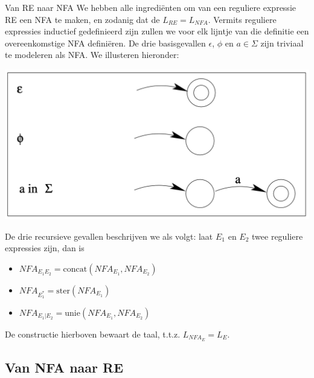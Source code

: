 \begin{theo}{Van RE naar NFA}
    We hebben alle ingrediënten om van een reguliere expressie RE een NFA te maken, en zodanig dat de $L_{RE} = L_{NFA}$.
    Vermits reguliere expressies inductief gedefinieerd zijn zullen we voor elk lijntje van die definitie een overeenkomstige NFA definiëren.
    De drie basisgevallen $\epsilon$, $\phi$ en $a \in \Sigma$ zijn triviaal te modeleren als NFA.
    We illusteren hieronder:
    \begin{center}
        \includegraphics[scale = 0.275]{Images/NFABasisGevallen.png}
    \end{center}
    De drie recursieve gevallen beschrijven we als volgt: laat $E_{1}$ en $E_{2}$ twee reguliere expressies zijn, dan is
    \begin{itemize}
        \item $NFA_{E_{1}E_{2}} = \text{concat}(NFA_{E_{1}},NFA_{E_{2}})$
        \item $NFA_{E_{1}^{*}} = \text{ster}(NFA_{E_{1}})$
        \item $NFA_{E_{1}|E_{2}} = \text{unie}(NFA_{E_{1}},NFA_{E_{2}})$
    \end{itemize}
    \noindent De constructie hierboven bewaart de taal, t.t.z. $L_{NFA_{E}} = L_{E}$.
\end{theo}

\subsection{Van NFA naar RE}

\vspace{0.5cm}

